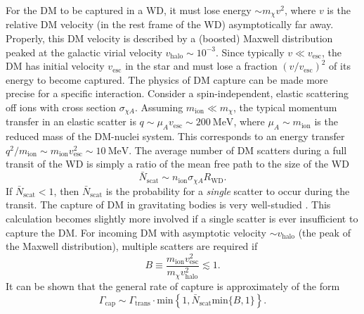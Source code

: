 \documentclass[preprintnumbers,amsmath,amssymb,prd,superscriptaddress]{revtex4}
\newcommand{\MeV}{\text{MeV}}
\def\r{\right)}
\def\l{\left(}
\begin{document}
For the DM to be captured in a WD, it must lose energy $\sim m_\chi v^2$, where $v$ is the relative DM velocity (in the rest frame of the WD) asymptotically far away.
Properly, this DM velocity is described by a (boosted) Maxwell distribution peaked at the galactic virial velocity $v_\text{halo} \sim 10^{-3}$. 
Since typically $v \ll v_\text{esc}$, the DM has initial velocity $v_\text{esc}$ in the star and must lose a fraction $(v/v_\text{esc})^2$ of its energy to become captured. 
The physics of DM capture can be made more precise for a specific interaction.
Consider a spin-independent, elastic scattering off ions with cross section $\sigma_{\chi A}$. 
Assuming $m_\text{ion} \ll m_\chi$, the typical momentum transfer in an elastic scatter is $q \sim \mu_{A} v_\text{esc} \sim 200 ~\MeV$, where $\mu_{A} \sim m_\text{ion}$ is the reduced mass of the DM-nuclei system. 
This corresponds to an energy transfer $q^2/m_\text{ion} \sim m_\text{ion} v_\text{esc}^2 \sim 10 ~\MeV$. 
The average number of DM scatters during a full transit of the WD is simply a ratio of the mean free path to the size of the WD
\begin{equation}
\bar{N}_\text{scat} \sim n_\text{ion} \sigma_{\chi A} R_\text{WD}.
\end{equation}
If $\bar{N}_\text{scat} < 1$, then $\bar{N}_\text{scat}$ is the probability for a \emph{single} scatter to occur during the transit. 
The capture of DM in gravitating bodies is very well-studied \cite{Gould}. 
This calculation becomes slightly more involved if a single scatter is ever insufficient to capture the DM.
For incoming DM with asymptotic velocity $\sim v_\text{halo}$ (the peak of the Maxwell distribution), multiple scatters are required if
\begin{equation}
B \equiv \frac{m_\text{ion} v_\text{esc}^2}{m_\chi v_\text{halo}^2} \lesssim 1. 
\end{equation}
It can be shown that the general rate of capture is approximately of the form
\begin{equation}
\Gamma_\text{cap} \sim \Gamma_\text{trans} \cdot \text{min}\left \{1, \bar{N}_\text{scat} \text{min}\{B,1\}\right\}.
\end{equation}
\end{document}
